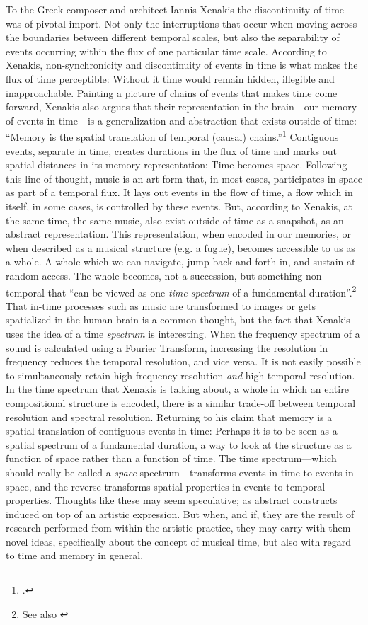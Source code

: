 To the Greek composer and architect Iannis Xenakis the discontinuity of time was of pivotal import. Not only the interruptions that occur when moving across the boundaries between different temporal scales, but also the separability of events occurring within the flux of one particular time scale. According to Xenakis, non-synchronicity and discontinuity of events in time is what makes the flux of time perceptible: Without it time would remain hidden, illegible and inapproachable. Painting a picture of chains of events that makes time come forward, Xenakis also argues that their representation in the brain---our memory of events in time---is a generalization and abstraction that exists outside of time: ``Memory is the spatial translation of temporal (causal) chains.''\footcite[263]{xenakis71} 
Contiguous events, separate in time, creates durations in the flux of time and marks out spatial distances in its memory representation: Time becomes space. Following this line of thought, music is an art form that, in most cases, participates in space as part of a temporal flux. It lays out events in the flow of time, a flow which in itself, in some cases, is controlled by these events. But, according to Xenakis, at the same time, the same music, also exist outside of time as a snapshot, as an abstract representation.
This representation, when encoded in our memories, or when described as a musical structure (e.g. a fugue), becomes accessible to us as a whole. A whole which we can navigate, jump back and forth in, and sustain at random access. The whole becomes, not a succession, but something non-temporal that ``can be viewed as one \emph{time spectrum} of a fundamental duration''.\footnote{\cite[73, my italics.]{roads} See also \cite{stockhausen57}}
That in-time processes such as music are transformed to images or gets spatialized in the human brain is a common thought, but the fact that Xenakis uses the idea of a time \emph{spectrum} is interesting. When the frequency spectrum of a sound is calculated using a Fourier Transform, increasing the resolution in frequency reduces the temporal resolution, and vice versa. It is not easily possible to simultaneously retain high frequency resolution \emph{and} high temporal resolution. In the time spectrum that Xenakis is talking about, a whole in which an entire compositional structure is encoded, there is a similar trade-off between temporal resolution and spectral resolution. Returning to his claim that memory is a spatial translation of contiguous events in time: Perhaps it is to be seen as a spatial spectrum of a fundamental duration, a way to look at the structure as a function of space rather than a function of time. The time spectrum---which should really be called a \emph{space} spectrum---transforms events in time to events in space, and the reverse transforms spatial properties in events to temporal properties. Thoughts like these may seem speculative; as abstract constructs induced on top of an artistic expression. But when, and if, they are the result of research performed from within the artistic practice, they may carry with them novel ideas, specifically about the concept of musical time, but also with regard to time and memory in general.

